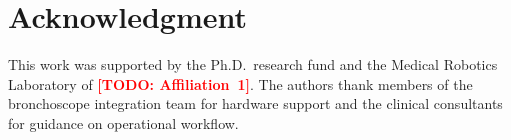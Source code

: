 \documentclass[journal,comsoc]{IEEEtran}
\newcommand{\TODO}[1]{\textcolor{red}{\textbf{[TODO: #1]}}}
\begin{document}
\section*{Acknowledgment}
This work was supported by the Ph.D.\ research fund and the
Medical Robotics Laboratory of \TODO{Affiliation~1}. The authors thank
members of the bronchoscope integration team for hardware support
and the clinical consultants for guidance on operational workflow.

\balance


\end{document}

